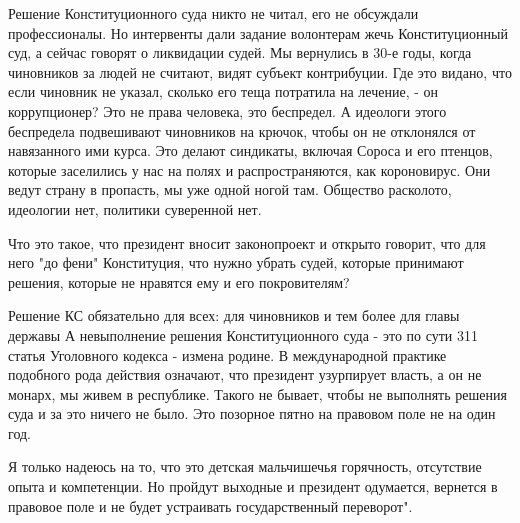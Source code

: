 Решение Конституционного суда никто не читал, его не обсуждали профессионалы.
Но интервенты дали задание волонтерам жечь Конституционный суд, а сейчас
говорят о ликвидации судей. Мы вернулись в 30-е годы, когда чиновников за людей
не считают, видят субъект контрибуции. Где это видано, что если чиновник не
указал, сколько его теща потратила на лечение, - он коррупционер? Это не права
человека, это беспредел. А идеологи этого беспредела подвешивают чиновников на
крючок, чтобы он не отклонялся от навязанного ими курса. Это делают синдикаты,
включая Сороса и его птенцов, которые заселились у нас на полях и
распространяются, как короновирус. Они ведут страну в пропасть, мы уже одной
ногой там. Общество расколото, идеологии нет, политики суверенной нет.

Что это такое, что президент вносит законопроект и открыто говорит, что для
него "до фени" Конституция, что нужно убрать судей, которые принимают решения,
которые не нравятся ему и его покровителям?

Решение КС обязательно для всех: для чиновников и тем более для главы державы А
невыполнение решения Конституционного суда - это по сути 311 статья Уголовного
кодекса - измена родине. В международной практике подобного рода действия
означают, что президент узурпирует власть, а он не монарх, мы живем в
республике. Такого не бывает, чтобы не выполнять решения суда и за это ничего
не было. Это позорное пятно на правовом поле не на один год.

Я только надеюсь на то, что это детская мальчишечья горячность, отсутствие
опыта и компетенции. Но пройдут выходные и президент одумается, вернется в
правовое поле и не будет устраивать государственный переворот".
